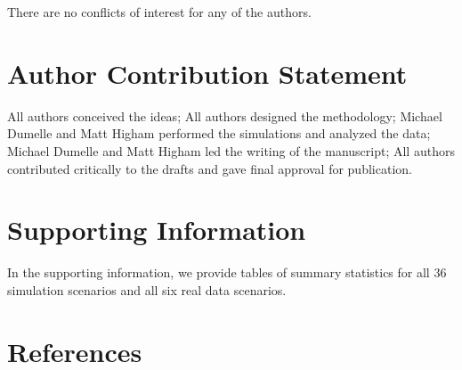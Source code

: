 \documentclass[]{elsarticle} %
\begin{document}
There are no conflicts of interest for any of the authors.

\hypertarget{author-contribution-statement}{%
\section*{Author Contribution
Statement}\label{author-contribution-statement}}

All authors conceived the ideas; All authors designed the methodology;
Michael Dumelle and Matt Higham performed the simulations and analyzed
the data; Michael Dumelle and Matt Higham led the writing of the
manuscript; All authors contributed critically to the drafts and gave
final approval for publication.

\hypertarget{supporting-information}{%
\section*{Supporting Information}\label{supporting-information}}

In the supporting information, we provide tables of summary statistics
for all 36 simulation scenarios and all six real data scenarios.

\hypertarget{references}{%
\section*{References}\label{references}}
\end{document}
